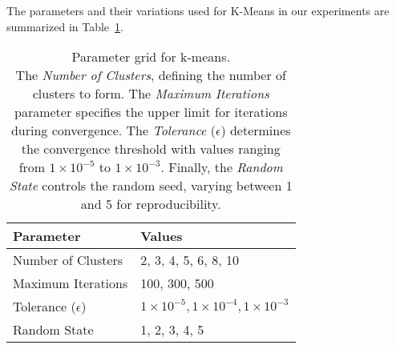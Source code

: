 The parameters and their variations used for K-Means in our experiments are summarized in Table~\ref{tab:kmeans-param-grid}.

\begin{table}[h!]
\centering
\begin{tabularx}{\columnwidth}{|X|X|}
    \hline
    \textbf{Parameter} & \textbf{Values} \\ \hline
    Number of Clusters  & 2, 3, 4, 5, 6, 8, 10 \\ \hline
    Maximum Iterations & 100, 300, 500 \\ \hline
    Tolerance (\(\epsilon\)) & \(1 \times 10^{-5}, 1 \times 10^{-4}, 1 \times 10^{-3}\) \\ \hline
    Random State & 1, 2, 3, 4, 5 \\ \hline
\end{tabularx}
\caption{
    Parameter grid for k-means.\\ 
    The \textit{Number of Clusters}, defining the number of clusters to form.
    The \textit{Maximum Iterations} parameter specifies the upper limit for iterations during convergence.
    The \textit{Tolerance} (\(\epsilon\)) determines the convergence threshold with values ranging from \(1 \times 10^{-5}\) to \(1 \times 10^{-3}\). 
    Finally, the \textit{Random State} controls the random seed, varying between 1 and 5 for reproducibility.
}
\label{tab:kmeans-param-grid}
\end{table}






